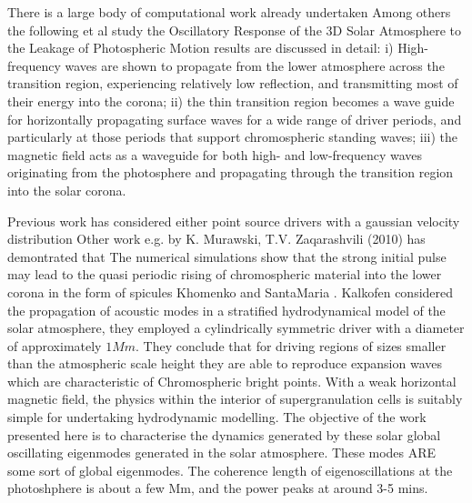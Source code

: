 \documentclass[final,1p]{elsarticle}
\begin{document}
There is a large body of computational work already undertaken Among others the following \cite{Fedun2009} et al study the Oscillatory Response of the 3D Solar Atmosphere to the Leakage of Photospheric Motion results are discussed in detail: i) High-frequency waves are shown to propagate from the lower atmosphere across the transition region, experiencing relatively low reflection, and transmitting most of their energy into the corona; ii) the thin transition region becomes a wave guide for horizontally propagating surface waves for a wide range of driver periods, and particularly at those periods that support chromospheric standing waves; iii) the magnetic field acts as a waveguide for both high- and low-frequency waves originating from the photosphere and propagating through the transition region into the solar corona.


Previous work has considered either point source drivers with a gaussian velocity distribution Other work e.g. by K. Murawski, T.V. Zaqarashvili (2010) \cite{Murawski2010} has demontrated that The numerical simulations show that the strong initial pulse may lead to the quasi periodic rising of chromospheric material into the lower corona in the form of spicules Khomenko and SantaMaria \cite{Khomenko2012}. Kalkofen \cite{Kalkofen2010} considered the propagation of acoustic modes in a stratified hydrodynamical model of the solar atmosphere, they employed a cylindrically symmetric driver with a diameter of approximately $1Mm$. They conclude that for driving regions of sizes smaller than the atmospheric scale height they are able to reproduce expansion waves which are characteristic of Chromospheric bright points. With a weak horizontal magnetic field, the physics within the interior of supergranulation cells \cite{Lites2008} is suitably simple for undertaking hydrodynamic modelling. The objective of the work presented here  is to characterise the dynamics generated by these solar global oscillating eigenmodes generated in the solar atmosphere.  These modes ARE some sort of global eigenmodes. The coherence length of eigenoscillations at the photoshphere is about a few Mm, and the power peaks at around 3-5 mins. 
\end{document}
